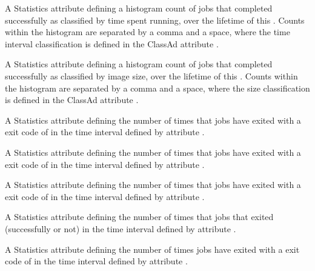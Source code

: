 \begin{description}
\item[\AdAttr{JobsCompletedRuntimes}:] A Statistics attribute defining
  a histogram count of jobs that completed successfully 
  as classified by time spent running,
  over the lifetime of this .
  Counts within the histogram are separated by a comma and a space, 
  where the time interval classification is defined in the ClassAd attribute
  .

\item[\AdAttr{JobsCompletedSizes}:] A Statistics attribute defining
  a histogram count of jobs that completed successfully
  as classified by image size,
  over the lifetime of this .
  Counts within the histogram are separated by a comma and a space, 
  where the size classification is defined in the ClassAd attribute
  .

\item[\AdAttr{JobsCoredumped}:] A Statistics attribute defining
  the number of times that jobs have exited 
  with a  exit code of 
  in the time interval defined by attribute .

\item[\AdAttr{JobsDebugLogError}:] A Statistics attribute defining
  the number of times that jobs have exited 
  with a  exit code of 
  in the time interval defined by attribute .

\item[\AdAttr{JobsExecFailed}:]  A Statistics attribute defining
  the number of times that jobs have exited 
  with a  exit code of 
  in the time interval defined by attribute .

\item[\AdAttr{JobsExited}:]  A Statistics attribute defining
  the number of times that jobs that exited 
  (successfully or not)
  in the time interval defined by attribute .

\item[\AdAttr{JobsExitedAndClaimClosing}:]  A Statistics attribute defining
  the number of times jobs have exited 
  with a  exit code of 
  in the time interval defined by attribute .


\end{description}
